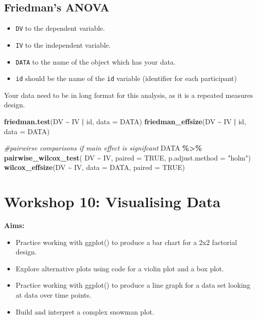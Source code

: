 \documentclass[
]{book}
\newenvironment{Shaded}{\begin{snugshade}}{\end{snugshade}}
\newcommand{\AttributeTok}[1]{\textcolor[rgb]{0.13,0.29,0.53}{#1}}
\newcommand{\CommentTok}[1]{\textcolor[rgb]{0.56,0.35,0.01}{\textit{#1}}}
\newcommand{\ConstantTok}[1]{\textcolor[rgb]{0.56,0.35,0.01}{#1}}
\newcommand{\FunctionTok}[1]{\textcolor[rgb]{0.13,0.29,0.53}{\textbf{#1}}}
\newcommand{\NormalTok}[1]{#1}
\newcommand{\SpecialCharTok}[1]{\textcolor[rgb]{0.81,0.36,0.00}{\textbf{#1}}}
\newcommand{\StringTok}[1]{\textcolor[rgb]{0.31,0.60,0.02}{#1}}
\providecommand{\tightlist}{%
  \setlength{\itemsep}{0pt}\setlength{\parskip}{0pt}}
\let\oldsection\section
\renewcommand{\section}{\needspace{5\baselineskip}\oldsection}
\begin{document}
\section{Friedman's ANOVA}\label{friedmans-anova}

\begin{itemize}
\tightlist
\item
  \texttt{DV} to the dependent variable.
\item
  \texttt{IV} to the independent variable.
\item
  \texttt{DATA} to the name of the object which has your data.
\item
  \texttt{id} should be the name of the \texttt{id} variable (identifier for each participant)
\end{itemize}

Your data need to be in long format for this analysis, as it is a repeated measures design.

\begin{Shaded}
\begin{Highlighting}[]
\FunctionTok{friedman.test}\NormalTok{(DV }\SpecialCharTok{\textasciitilde{}}\NormalTok{ IV }\SpecialCharTok{|}\NormalTok{ id, }\AttributeTok{data =}\NormalTok{ DATA)}
\FunctionTok{friedman\_effsize}\NormalTok{(DV }\SpecialCharTok{\textasciitilde{}}\NormalTok{ IV }\SpecialCharTok{|}\NormalTok{ id, }\AttributeTok{data =}\NormalTok{ DATA)}

\CommentTok{\#pairwirse comparisons if main effect is signifcant}
\NormalTok{DATA }\SpecialCharTok{\%\textgreater{}\%}
  \FunctionTok{pairwise\_wilcox\_test}\NormalTok{(}
\NormalTok{    DV }\SpecialCharTok{\textasciitilde{}}\NormalTok{ IV,}
    \AttributeTok{paired =} \ConstantTok{TRUE}\NormalTok{,}
    \AttributeTok{p.adjust.method =} \StringTok{"holm"}\NormalTok{)}
\FunctionTok{wilcox\_effsize}\NormalTok{(DV }\SpecialCharTok{\textasciitilde{}}\NormalTok{ IV, }\AttributeTok{data =}\NormalTok{ DATA, }\AttributeTok{paired =} \ConstantTok{TRUE}\NormalTok{)}
\end{Highlighting}
\end{Shaded}

\chapter{Workshop 10: Visualising Data}\label{workshop-10-visualising-data}

\textbf{Aims:}

\begin{itemize}
\tightlist
\item
  Practice working with ggplot() to produce a bar chart for a 2x2 factorial design.
\item
  Explore alternative plots using code for a violin plot and a box plot.
\item
  Practice working with ggplot() to produce a line graph for a data set looking at data over time points.
\item
  Build and interpret a complex snowman plot.
\end{itemize}
\end{document}
